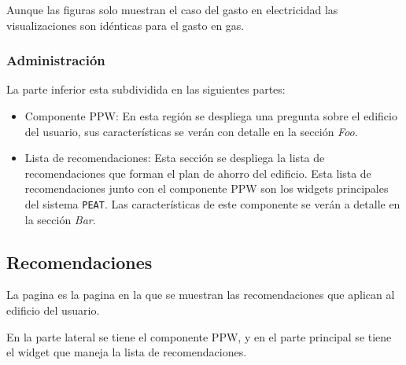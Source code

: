 Aunque las figuras solo muestran el caso del gasto en electricidad las
visualizaciones son idénticas para el gasto en gas.

\subsubsection{Administración}

La parte inferior esta subdividida en las siguientes partes:
\begin{itemize}
\item Componente PPW: En esta región se despliega una pregunta
  sobre el edificio del usuario, sus características se
  verán con detalle en la sección \textit{Foo}.
\item Lista de recomendaciones: Esta sección se despliega la lista de recomendaciones
  que forman el plan de ahorro del edificio. Esta lista de recomendaciones junto con
  el componente PPW son los widgets principales del sistema \texttt{PEAT}.
  Las características de este componente se verán a detalle en la sección
  \textit{Bar}.
\end{itemize}

\subsection{Recomendaciones}

La pagina  es la pagina en la que se muestran
las recomendaciones que aplican al edificio del usuario.

En la parte lateral se tiene el componente PPW, y en el parte principal
se tiene el widget que maneja la lista de recomendaciones.


